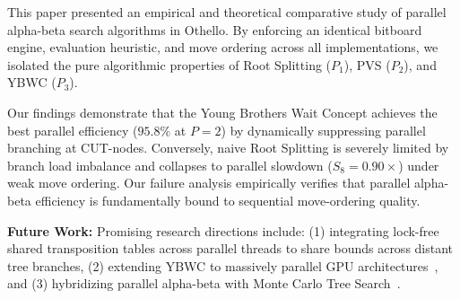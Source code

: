\documentclass[11pt,a4paper]{article}
\begin{document}
This paper presented an empirical and theoretical comparative study of parallel alpha-beta search algorithms in Othello. By enforcing an identical bitboard engine, evaluation heuristic, and move ordering across all implementations, we isolated the pure algorithmic properties of Root Splitting ($P_1$), PVS ($P_2$), and YBWC ($P_3$). 

Our findings demonstrate that the Young Brothers Wait Concept achieves the best parallel efficiency ($95.8\%$ at $P=2$) by dynamically suppressing parallel branching at CUT-nodes. Conversely, naive Root Splitting is severely limited by branch load imbalance and collapses to parallel slowdown ($S_8 = 0.90\times$) under weak move ordering. Our failure analysis empirically verifies that parallel alpha-beta efficiency is fundamentally bound to sequential move-ordering quality.

\textbf{Future Work:} Promising research directions include: (1) integrating lock-free shared transposition tables across parallel threads to share bounds across distant tree branches, (2) extending YBWC to massively parallel GPU architectures~\cite{cohen2022high}, and (3) hybridizing parallel alpha-beta with Monte Carlo Tree Search~\cite{cazenave2021parallel}.



\end{document}

